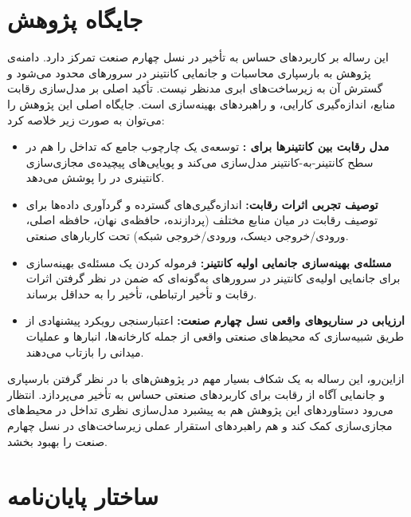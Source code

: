\section{جایگاه پژوهش}

این رساله بر کاربردهای حساس به تأخیر در نسل چهارم صنعت تمرکز دارد. دامنه‌ی پژوهش به بارسپاری محاسبات و جانمایی کانتینر در سرورهای  محدود می‌شود و گسترش آن به زیرساخت‌های ابری مدنظر نیست. تأکید اصلی بر مدل‌سازی رقابت منابع، اندازه‌گیری کارایی، و راهبردهای بهینه‌سازی است.
جایگاه اصلی این پژوهش را می‌توان به صورت زیر خلاصه کرد:

\begin{itemize}
\item
\textbf{مدل رقابت بین کانتینر‌ها برای :}
توسعه‌ی یک چارچوب جامع که تداخل را هم در سطح کانتینر-به-کانتینر مدل‌سازی می‌کند و پویایی‌های پیچیده‌ی مجازی‌سازی کانتینری در  را پوشش می‌دهد.

\item
\textbf{توصیف تجربی اثرات رقابت:}
اندازه‌گیری‌های گسترده و گردآوری داده‌ها برای توصیف رقابت در میان منابع مختلف (پردازنده، حافظه‌ی نهان، حافظه اصلی، ورودی/خروجی دیسک، ورودی/خروجی شبکه) تحت کاربارهای صنعتی.

\item
\textbf{مسئله‌ی بهینه‌سازی جانمایی اولیه کانتینر:}
فرموله‌ کردن یک مسئله‌ی بهینه‌سازی برای جانمایی اولیه‌ی کانتینر در سرورهای  به‌گونه‌ای که ضمن در نظر گرفتن اثرات رقابت و تأخیر ارتباطی، تأخیر را به حداقل برساند.

\item
\textbf{ارزیابی در سناریوهای واقعی نسل چهارم صنعت:}
اعتبارسنجی رویکرد پیشنهادی از طریق شبیه‌سازی‌ که محیط‌های صنعتی واقعی از جمله کارخانه‌ها، انبارها و عملیات میدانی را بازتاب می‌دهند.

\end{itemize}

ازاین‌رو، این رساله به یک شکاف بسیار مهم در پژوهش‌های  با در نظر گرفتن بارسپاری و جانمایی آگاه از رقابت برای کاربردهای صنعتی حساس به تأخیر می‌پردازد. انتظار می‌رود دستاوردهای این پژوهش هم به پیشبرد مدل‌سازی نظری تداخل در محیط‌های مجازی‌سازی کمک کند و هم راهبردهای استقرار عملی زیرساخت‌های  در نسل چهارم صنعت را بهبود بخشد.

\section{ساختار پایان‌نامه}

